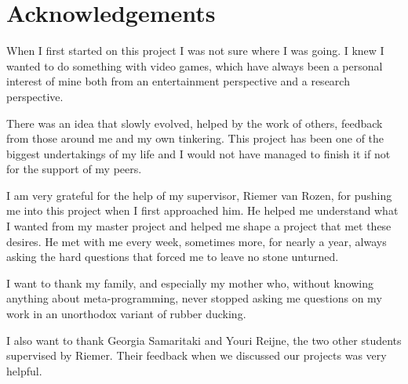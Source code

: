 \chapter*{Acknowledgements}
When I first started on this project I was not sure where I was going. I knew I wanted to do something with video games, which have always been a personal interest of mine both from an entertainment perspective and a research perspective. 

There was an idea that slowly evolved, helped by the work of others, feedback from those around me and my own tinkering. This project has been one of the biggest undertakings of my life and I would not have managed to finish it if not for the support of my peers.

I am very grateful for the help of my supervisor, Riemer van Rozen, for pushing me into this project when I first approached him. He helped me understand what I wanted from my master project and helped me shape a project that met these desires. He met with me every week, sometimes more, for nearly a year, always asking the hard questions that forced me to leave no stone unturned.

I want to thank my family, and especially my mother who, without knowing anything about meta-programming, never stopped asking me questions on my work in an unorthodox variant of rubber ducking.

I also want to thank Georgia Samaritaki and Youri Reijne, the two other students supervised by Riemer. Their feedback when we discussed our projects was very helpful.